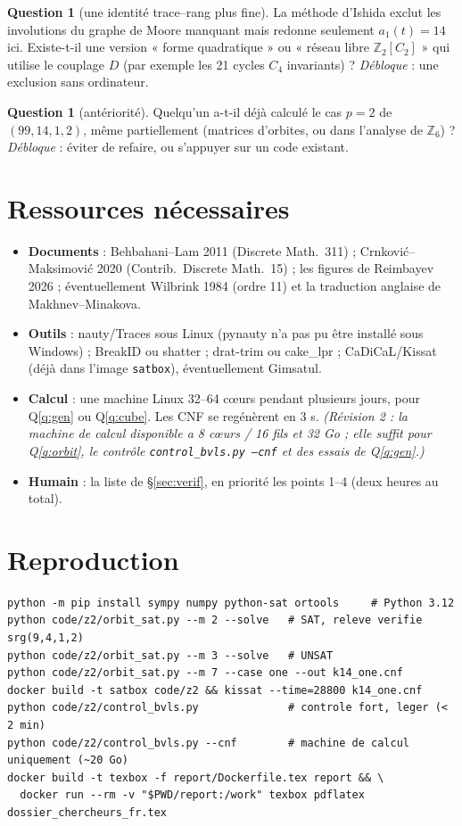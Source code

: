 \documentclass[11pt,a4paper]{article}
\theoremstyle{definition}
\newtheorem{question}[theorem]{Question}
\theoremstyle{remark}
\newcommand{\Z}{\mathbb{Z}}
\newcommand{\code}[1]{\texttt{#1}}
\begin{document}
\begin{question}[une identité trace--rang plus fine]\label{q:ishida}
La méthode d'Ishida exclut les involutions du graphe de Moore manquant mais redonne seulement $a_1(t)=14$ ici. Existe-t-il une version « forme quadratique » ou « réseau libre $\Z_2[C_2]$ » qui utilise le couplage $D$ (par exemple les 21 cycles $C_4$ invariants) ? \emph{Débloque} : une exclusion sans ordinateur.
\end{question}

\begin{question}[antériorité]\label{q:ant}
Quelqu'un a-t-il déjà calculé le cas $p=2$ de $(99,14,1,2)$, même partiellement (matrices d'orbites, ou dans l'analyse de $\Z_6$) ? \emph{Débloque} : éviter de refaire, ou s'appuyer sur un code existant.
\end{question}

\section{Ressources nécessaires}\label{sec:besoins}
\begin{itemize}[nosep]
\item \textbf{Documents} : Behbahani--Lam 2011 (Discrete Math.\ 311) ; Crnković--Maksimović 2020 (Contrib.\ Discrete Math.\ 15) ; les figures de Reimbayev 2026 ; éventuellement Wilbrink 1984 (ordre 11) et la traduction anglaise de Makhnev--Minakova.
\item \textbf{Outils} : nauty/Traces sous Linux (pynauty n'a pas pu être installé sous Windows) ; BreakID ou shatter ; drat-trim ou cake\_lpr ; CaDiCaL/Kissat (déjà dans l'image \code{satbox}), éventuellement Gimsatul.
\item \textbf{Calcul} : une machine Linux 32--64 cœurs pendant plusieurs jours, pour Q\ref{q:gen} ou Q\ref{q:cube}. Les CNF se regénèrent en 3 s. \emph{(Révision 2 : la machine de calcul disponible a 8 cœurs / 16 fils et 32 Go ; elle suffit pour Q\ref{q:orbit}, le contrôle \code{control\_bvls.py --cnf} et des essais de Q\ref{q:gen}.)}
\item \textbf{Humain} : la liste de §\ref{sec:verif}, en priorité les points 1--4 (deux heures au total).
\end{itemize}

\appendix
\section{Reproduction}
\begin{verbatim}
python -m pip install sympy numpy python-sat ortools     # Python 3.12
python code/z2/orbit_sat.py --m 2 --solve   # SAT, releve verifie srg(9,4,1,2)
python code/z2/orbit_sat.py --m 3 --solve   # UNSAT
python code/z2/orbit_sat.py --m 7 --case one --out k14_one.cnf
docker build -t satbox code/z2 && kissat --time=28800 k14_one.cnf
python code/z2/control_bvls.py              # controle fort, leger (< 2 min)
python code/z2/control_bvls.py --cnf        # machine de calcul uniquement (~20 Go)
docker build -t texbox -f report/Dockerfile.tex report && \
  docker run --rm -v "$PWD/report:/work" texbox pdflatex dossier_chercheurs_fr.tex
\end{verbatim}
\end{document}
